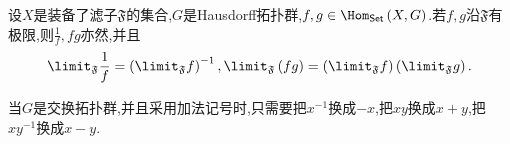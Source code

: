\begin{proposition}{}{}
	设$X$是装备了滤子$\mathfrak{F}$的集合,$G$是Hausdorff拓扑群,$f,g\in\Hom_{\mathsf{Set}}\left(X,G\right)$.若$f,g$沿$\mathfrak{F}$有极限,则$\frac{1}{f},fg$亦然,并且
	\begin{align*}
		\limit_{\mathfrak{F}}\frac{1}{f}=\left(\limit_{\mathfrak{F}}f\right)^{-1},\limit_{\mathfrak{F}}\left(fg\right)=\left(\limit_{\mathfrak{F}}f\right)\left(\limit_{\mathfrak{F}}g\right).
	\end{align*}
\end{proposition}

\begin{remark}{}{}
	当$G$是交换拓扑群,并且采用加法记号时,只需要把$x^{-1}$换成$-x$,把$xy$换成$x+y$,把$xy^{-1}$换成$x-y$.
\end{remark}






















